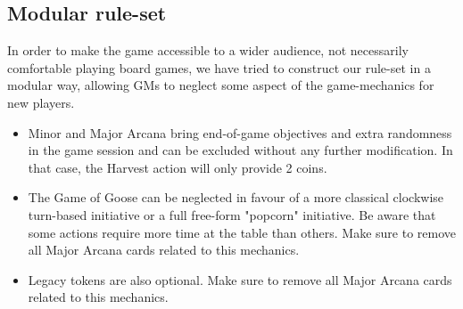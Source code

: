 \documentclass{article}
\begin{document}
\begin{multicols}{2}
\subsection{Modular rule-set}

In order to make the game accessible to a wider audience, not necessarily comfortable playing board games, we have tried to construct our rule-set in a modular way, allowing GMs to neglect some aspect of the game-mechanics for new players.

\begin{itemize}
\item Minor and Major Arcana bring end-of-game objectives and extra randomness in the game session and can be excluded without any further modification. In that case, the Harvest action will only provide 2 coins.
\item The Game of Goose can be neglected in favour of a more classical clockwise turn-based initiative or a full free-form "popcorn" initiative. Be aware that some actions require more time at the table than others. Make sure to remove all Major Arcana cards related to this mechanics.
\item Legacy tokens are also optional. Make sure to remove all Major Arcana cards related to this mechanics.
\end{itemize}


\end{multicols}
\end{document}

